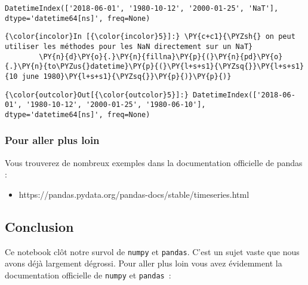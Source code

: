     \begin{Verbatim}[commandchars=\\\{\},frame=single,framerule=0.3mm,rulecolor=\color{cellframecolor}]
DatetimeIndex(['2018-06-01', '1980-10-12', '2000-01-25', 'NaT'], dtype='datetime64[ns]', freq=None)
\end{Verbatim}

    \begin{Verbatim}[commandchars=\\\{\},frame=single,framerule=0.3mm,rulecolor=\color{cellframecolor}]
{\color{incolor}In [{\color{incolor}5}]:} \PY{c+c1}{\PYZsh{} on peut utiliser les méthodes pour les NaN directement sur un NaT}
        \PY{n}{d}\PY{o}{.}\PY{n}{fillna}\PY{p}{(}\PY{n}{pd}\PY{o}{.}\PY{n}{to\PYZus{}datetime}\PY{p}{(}\PY{l+s+s1}{\PYZsq{}}\PY{l+s+s1}{10 june 1980}\PY{l+s+s1}{\PYZsq{}}\PY{p}{)}\PY{p}{)}
\end{Verbatim}


\begin{Verbatim}[commandchars=\\\{\},frame=single,framerule=0.3mm,rulecolor=\color{cellframecolor}]
{\color{outcolor}Out[{\color{outcolor}5}]:} DatetimeIndex(['2018-06-01', '1980-10-12', '2000-01-25', '1980-06-10'], dtype='datetime64[ns]', freq=None)
\end{Verbatim}
            
    \hypertarget{pour-aller-plus-loin}{%
\subsubsection{Pour aller plus loin}\label{pour-aller-plus-loin}}

    Vous trouverez de nombreux exemples dans la documentation officielle de
pandas :

\begin{itemize}
\tightlist
\item
  https://pandas.pydata.org/pandas-docs/stable/timeseries.html
\end{itemize}

    \hypertarget{conclusion}{%
\subsection{Conclusion}\label{conclusion}}

    Ce notebook clôt notre survol de \texttt{numpy} et \texttt{pandas}.
C'est un sujet vaste que nous avons déjà largement dégrossi. Pour aller
plus loin vous avez évidemment la documentation officielle de
\texttt{numpy} et \texttt{pandas}~:

